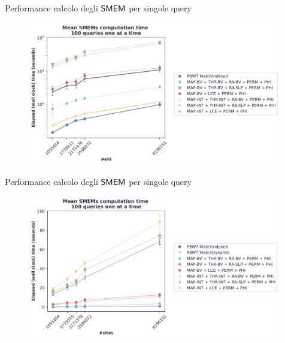 \documentclass[]{beamer}
\def\SMEM{\mbox{\rm {\sf SMEM}}}
\begin{document}
\begin{frame}[plain]{Performance calcolo degli $\SMEM$ per singole query}
  \begin{figure}[H]
    \centering
    \includegraphics[width=0.99\textwidth]{img/exe_time_single_paper2.pdf}
  \end{figure}
\end{frame}
\begin{frame}[plain]{Performance calcolo degli $\SMEM$ per singole query}
  \begin{figure}[H]
    \centering
    \includegraphics[width=0.99\textwidth]{img/exe_time_single_paper.pdf}
  \end{figure}
\end{frame}
\end{document}

